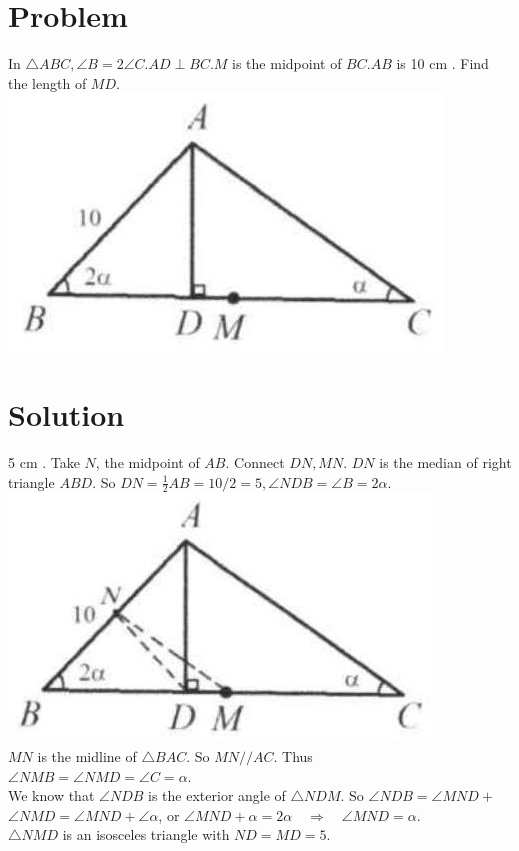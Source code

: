 \documentclass{article}
\begin{document}
\section*{Problem}
In \(\triangle A B C, \angle B=2 \angle C . A D \perp B C . M\) is the midpoint of \(B C . A B\) is 10 cm . Find the length of \(M D\).\\
\centering
\includegraphics[width=\textwidth]{images/045(4).jpg}

\section*{Solution}
5 cm .
Take \(N\), the midpoint of \(A B\). Connect \(D N, M N\). \(D N\) is the median of right triangle \(A B D\). So \(D N=\frac{1}{2} A B=10 / 2=5, \angle N D B=\angle B=2 \alpha\).\\
\centering
\includegraphics[width=\textwidth]{images/051(1).jpg}\\
\(M N\) is the midline of \(\triangle B A C\). So \(M N / / A C\). Thus\\
\(\angle N M B=\angle N M D=\angle C=\alpha\).\\
We know that \(\angle N D B\) is the exterior angle of \(\triangle N D M\). So \(\angle N D B=\angle M N D+\) \(\angle N M D=\angle M N D+\angle \alpha\), or \(\angle M N D+\alpha=2 \alpha \quad \Rightarrow \quad \angle M N D=\alpha\).\\
\(\triangle N M D\) is an isosceles triangle with \(N D=M D=5\).
\end{document}
